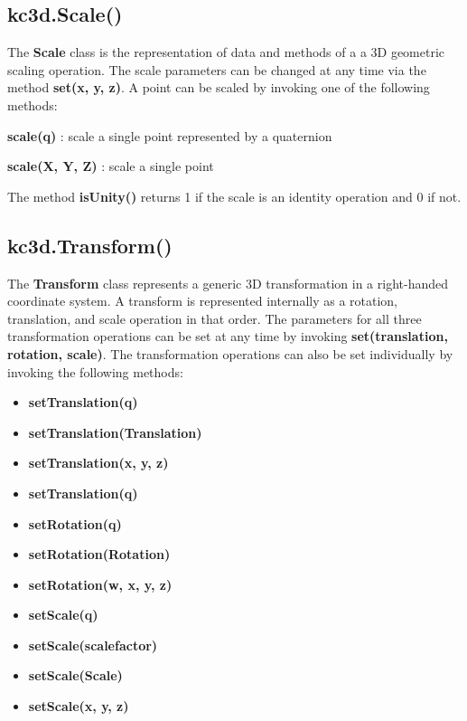 \documentclass[a4paper, dvipdfm]{article}
\begin{document}
\subsection{kc3d.Scale()}
The \textbf{Scale} class is the representation of data and methods of a
a 3D geometric scaling operation.  The scale parameters can be changed at
any time via the method \textbf{set(x, y, z)}. A point can be scaled by invoking
one of the following methods:

\textbf{scale(q)} : scale a single point represented by a quaternion

\textbf{scale(X, Y, Z)} : scale a single point

The method \textbf{isUnity()} returns 1 if the scale is an identity operation and
0 if not.

\subsection{kc3d.Transform()}
The \textbf{Transform} class represents a generic 3D transformation in a right-handed
coordinate system. A transform is represented internally as a rotation, translation,
and scale operation in that order.  The parameters for all three transformation
operations can be set at any time by invoking \textbf{set(translation, rotation, scale)}.
The transformation operations can also be set individually by invoking the following
methods:

\begin{itemize}
\item \textbf{setTranslation(q)}\\
\item \textbf{setTranslation(Translation)}\\
\item \textbf{setTranslation(x, y, z)}\\
\item \textbf{setTranslation(q)}\\
\item \textbf{setRotation(q)}\\
\item \textbf{setRotation(Rotation)}\\
\item \textbf{setRotation(w, x, y, z)}\\
\item \textbf{setScale(q)}\\
\item \textbf{setScale(scalefactor)}\\
\item \textbf{setScale(Scale)}\\
\item \textbf{setScale(x, y, z)}\\
\end{itemize}
\end{document}
